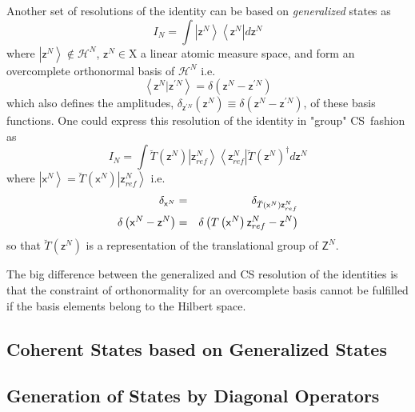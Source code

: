 \documentclass[aps,preprint]{revtex4}
\begin{document}
Another set of resolutions of the identity can be based on \emph{generalized 
}states as 
\begin{equation}
I_{N}=\int \left\vert \mathsf{z}^{N}\right\rangle \left\langle \mathsf{z}%
^{N}\right\vert d\mathsf{z}^{N}
\end{equation}%
where $\left\vert \mathsf{z}^{N}\right\rangle \notin \mathcal{H}^{N}$, $%
\mathsf{z}^{N}\in \mathrm{X}$ a linear atomic measure space, and form an
overcomplete orthonormal basis of $\mathcal{H}^{N}$ i.e. 
\begin{equation}
\left\langle \mathsf{z}^{N}|\mathsf{z}^{\prime N}\right\rangle =\delta
\left( \mathsf{z}^{N}-\mathsf{z}^{\prime N}\right)
\end{equation}%
which also defines the amplitudes, $\delta _{\mathsf{z}^{\prime N}}\left( 
\mathsf{z}^{N}\right) \equiv \delta \left( \mathsf{z}^{N}-\mathsf{z}^{\prime
N}\right) $, of these basis functions. One could express this resolution of
the identity in "group" CS\ fashion as 
\begin{equation}
I_{N}=\int \breve{T}\left( \mathsf{z}^{N}\right) \left\vert \mathsf{z}%
_{ref}^{N}\right\rangle \left\langle \mathsf{z}_{ref}^{N}\right\vert \breve{T%
}\left( \mathsf{z}^{N}\right) ^{\dagger }d\mathsf{z}^{N}
\end{equation}%
where $\left\vert \mathsf{x}^{N}\right\rangle =\breve{T}\left( \mathsf{x}%
^{N}\right) \left\vert \mathsf{z}_{ref}^{N}\right\rangle $ i.e. 
\begin{eqnarray}
\delta _{\mathsf{x}^{N}} &=&\delta _{\breve{T}\left( \mathsf{x}^{N}\right) 
\mathsf{z}_{ref}^{N}}  \notag \\
\delta \left( \mathsf{x}^{N}-\mathsf{z}^{N}\right) &=&\delta \left( T\left( 
\mathsf{x}^{N}\right) \mathsf{z}_{ref}^{N}-\mathsf{z}^{N}\right)
\end{eqnarray}%
so that $\breve{T}\left( \mathsf{z}^{N}\right) $ is a representation of the
translational group of $\mathsf{Z}^{N}$.

The big difference between the generalized and CS resolution of the
identities is that the constraint of orthonormality for an overcomplete
basis cannot be fulfilled if the basis elements belong to the Hilbert space.

\subsection{ Coherent States based on Generalized States}

\subsection{Generation of States by Diagonal Operators}
\end{document}
